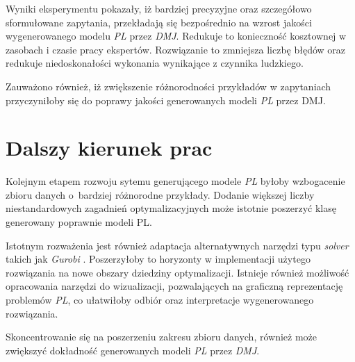Wyniki eksperymentu pokazały, iż bardziej precyzyjne oraz szczegółowo sformułowane zapytania, przekładają się bezpośrednio na wzrost jakości wygenerowanego modelu \textit{PL} przez \textit{DMJ}. Redukuje to konieczność kosztownej w zasobach i czasie pracy ekspertów. Rozwiązanie to zmniejsza liczbę błędów oraz redukuje niedoskonałości wykonania wynikające z czynnika ludzkiego. 

Zauważono również, iż zwiększenie różnorodności przykładów w zapytaniach przyczyniłoby się do poprawy jakości generowanych modeli \textit{PL} przez DMJ.

\section{Dalszy kierunek prac}

Kolejnym etapem rozwoju sytemu generującego modele \textit{PL} byłoby wzbogacenie zbioru danych o~bardziej różnorodne przykłady. Dodanie większej liczby niestandardowych zagadnień optymalizacyjnych może istotnie poszerzyć klasę generowany poprawnie modeli PL.

Istotnym rozważenia jest również adaptacja alternatywnych narzędzi typu \textit{solver} takich jak \textit{Gurobi} \cite{gurobi2023}. Poszerzyłoby to horyzonty w implementacji użytego rozwiązania na nowe obszary dziedziny optymalizacji. Istnieje również możliwość opracowania narzędzi do wizualizacji, pozwalających na graficzną reprezentację problemów \textit{PL}, co ułatwiłoby odbiór oraz interpretacje wygenerowanego rozwiązania. 

Skoncentrowanie się na poszerzeniu zakresu zbioru danych, również może zwiększyć dokładność generowanych modeli \textit{PL} przez \textit{DMJ}. 